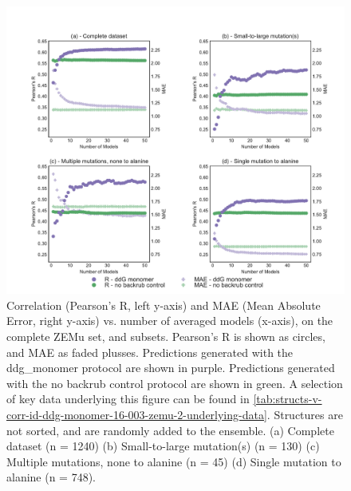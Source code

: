 \begin{figure}
  \includegraphics[width=\textwidth,keepaspectratio]{structs-v-corr-id-ddg-monomer-16-003-zemu-2.pdf}
  \caption[]{
    Correlation (Pearson's R, left y-axis) and MAE (Mean Absolute Error, right y-axis) vs. number of averaged models (x-axis), on the complete ZEMu set, and subsets.
    Pearson's R is shown as circles, and MAE as faded plusses.
Predictions generated with the ddg\_monomer protocol are shown in purple.
Predictions generated with the no backrub control protocol are shown in green.
    A selection of key data underlying this figure can be found in \cref{tab:structs-v-corr-id-ddg-monomer-16-003-zemu-2-underlying-data}.
    Structures are not sorted, and are randomly added to the ensemble. 
    (a) Complete dataset (n = 1240)
    (b) Small-to-large mutation(s) (n = 130)
    (c) Multiple mutations, none to alanine (n = 45)
    (d) Single mutation to alanine (n = 748).
  } \label{fig:structs-v-corr-id-ddg-monomer-16-003-zemu-2}
\end{figure}
